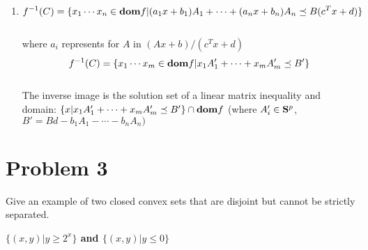 \documentclass{article}
\newcommand{\dom}{{\bf{dom}}}
\newcommand{\symm}{{\bf{S}}}
\theoremstyle{definition}
\theoremstyle{definition}
\theoremstyle{remark}
\begin{document}
{\begin{enumerate}
    \\\\The inverse image is the intersection of a ellipsoid and domain: $\{x|(x+x_c)^TM^{-1}(x+x_c)\leq 1\}\cap\dom f$ (where $M \in \symm^n_{++}$).
    \item $$f^{-1}(C)=\{x_1 \cdots x_n\in\dom f|(a_1x+b_1)A_1+ \cdots + (a_nx+b_n)A_n \preceq B(c^T x+d)\}$$
    \\ where $a_i$ represents for $A$ in $(Ax+b)/(c^Tx+d)$
    $$f^{-1}(C)=\{x_1 \cdots x_m\in\dom f|x_1 A'_1+ \cdots + x_m A'_m \preceq B'\}$$
    \\The inverse image is the solution set of a linear matrix inequality and domain: $\{x|x_1 A'_1+ \cdots + x_m A'_m \preceq B'\}\cap\dom f$ (where $A'_i\in \symm^p$, $B'=Bd-b_1A_1-\cdots-b_nA_n)$
\end{enumerate}
}

\section*{Problem 3}\label{exe-sep-hyp-strict-counterexample}
Give an example of two closed convex sets that are disjoint but cannot be strictly separated.

\bf{$\{(x,y)|y\geq2^x\}$ and $\{(x,y)|y\leq0\}$}

\end{document}
